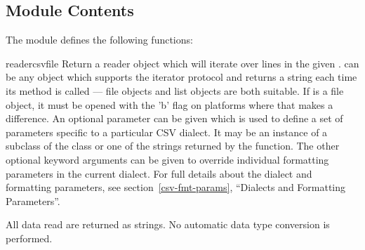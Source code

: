 \subsection{Module Contents \label{csv-contents}}

The  module defines the following functions:

\begin{funcdesc}{reader}{csvfile}
Return a reader object which will iterate over lines in the given
{}.   can be any object which supports the
iterator protocol and returns a string each time its 
method is called --- file objects and list objects are both suitable.  
If  is a file object, it must be opened with
the 'b' flag on platforms where that makes a difference.  An optional
{} parameter can be given
which is used to define a set of parameters specific to a particular CSV
dialect.  It may be an instance of a subclass of the 
class or one of the strings returned by the 
function.  The other optional {} keyword arguments can be
given to override individual formatting parameters in the current
dialect.  For full details about the dialect and formatting
parameters, see section~\ref{csv-fmt-params}, ``Dialects and Formatting
Parameters''.

All data read are returned as strings.  No automatic data type
conversion is performed.


\end{funcdesc}


